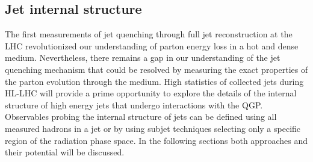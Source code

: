 \subsection{Jet internal structure}\label{sec:jetsub}
The first measurements of jet quenching through full jet reconstruction at the LHC revolutionized our understanding of parton energy loss in a hot and dense medium. Nevertheless, there remains a gap in our understanding of the jet quenching mechanism that could be resolved by measuring the exact properties of the parton evolution through the medium. High statistics of collected jets during HL-LHC will provide a prime opportunity to explore the details of the internal structure of high energy jets that undergo interactions with the QGP. Observables probing the internal structure of jets can be defined using all measured hadrons in a jet or by using subjet techniques selecting only a specific region of the radiation phase space. In the following sections both approaches and their potential will be discussed.

